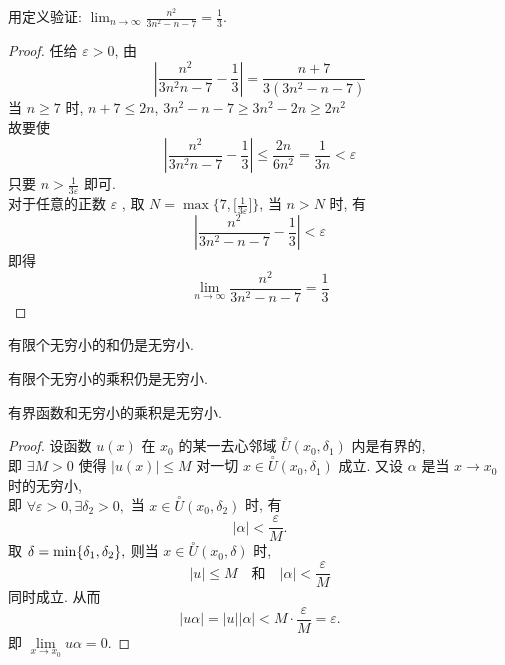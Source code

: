\documentclass[color=green,titlestyle=hang]{elegantbook}%
\begin{document}
\begin{example}
用定义验证: $\lim_{n\to\infty}\frac{n^2}{3n^2-n-7}=\frac{1}{3}$. 
\end{example}\begin{proof}
任给 $\varepsilon>0$, 由	
\[\left|\frac{n^2}{3n^2n-7}-\frac{1}{3}\right|=\frac{n+7}{3(3n^2-n-7)}\]
{\color{blue}当 $n\geqslant7$ 时}, $n+7\leqslant2n$, $3n^2-n-7\geqslant3n^2-2n\geqslant 2n^2$\\
故要使\[\left|\frac{n^2}{3n^2n-7}-\frac{1}{3}\right|\leqslant\frac{2n}{6n^2}=\frac{1}{3n}<\varepsilon\]
只要 $n>\frac{1}{3\varepsilon}$ 即可.\\
对于任意的正数 $\varepsilon$ , 取 {\color{blue}$N=\max\Big\{7,\big[\tfrac{1}{3\varepsilon}\big]\Big\}$}, 当 $n>N$ 时, 有\[\left|\frac{n^2}{3n^2-n-7}-\frac{1}{3}\right|<\varepsilon\]
即得\[\lim_{n\to\infty}\frac{n^2}{3n^2-n-7}=\frac{1}{3}\]
\end{proof}

\begin{property}
有限个无穷小的和仍是无穷小.
\end{property}

\begin{property}
有限个无穷小的乘积仍是无穷小.	
\end{property}

\begin{property}
有界函数和无穷小的乘积是无穷小.	
\end{property}\begin{proof}
设函数 $u(x)$ 在 $x_0$ 的某一去心邻域 $\overset{\circ}{U}(x_0,\delta_1)$ 内是有界的, \\
即 $\exists M>0$ 使得 $|u(x)|\leqslant M$ 对一切 $x\in \overset{\circ}{U}(x_0,\delta_1)$ 成立. 又设 $\alpha$ 是当 $x\to x_0$ 时的无穷小, \\
即 $\forall \varepsilon>0,\exists \delta_2>0,$ 当 $x\in \overset{\circ}{U}(x_0,\delta_2)$ 时, 有
$$|\alpha|<\frac{\varepsilon}{M}.$$
取 $\delta={\rm {min}}\{\delta_1,\delta_2\},$ 则当 $x\in \overset{\circ}{U}(x_0,\delta)$ 时,
$$|u|\leqslant M\quad \mbox{和}\quad |\alpha|<\frac{\varepsilon}{M}$$
同时成立. 从而
$$|u\alpha|=|u||\alpha|<M\cdot\frac{\varepsilon}{M}=\varepsilon.$$
即 $\lim\limits_{x\to x_0}u\alpha=0$.
\end{proof}

\end{document}
